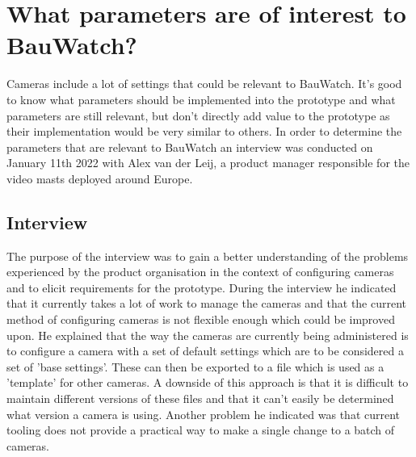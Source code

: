 \section{What parameters are of interest to BauWatch?}
Cameras include a lot of settings that could be relevant to BauWatch.
It's good to know what parameters should be implemented into the prototype and what parameters are still relevant, but don't directly add value to the prototype as their implementation would be very similar to others.
In order to determine the parameters that are relevant to BauWatch an interview was conducted on January 11th 2022 with Alex van der Leij, a product manager responsible for the video masts deployed around Europe.





\subsection{Interview}
The purpose of the interview was to gain a better understanding of the problems experienced
by the product organisation in the context of configuring cameras and to elicit requirements for the prototype. During the interview he indicated that it currently takes a lot of work to manage
the cameras and that the current method of configuring cameras is not flexible enough which could be improved upon. He explained that the way the cameras are currently being
administered is to configure a camera with a set of default settings which are to be considered a set of 'base settings'. These can then be exported to a file which is used as a
'template' for other
cameras. A downside of this approach is that it is difficult to maintain different versions of these files and that it can't easily be determined what version a camera is using.
Another problem he indicated was that current tooling does not provide a practical way to make a single change to a batch of cameras.



